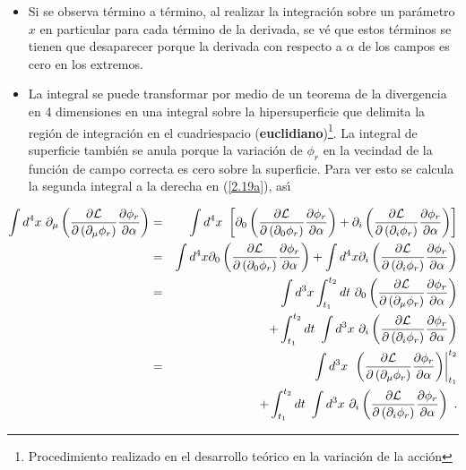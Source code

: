 \begin{itemize}
\item Si se observa t\'{e}rmino a t\'{e}rmino, al realizar la integraci\'{o}n sobre un parámetro $x$ en particular para cada t\'{e}rmino de la derivada, se v\'{e} que estos t\'{e}rminos se tienen que desaparecer porque la derivada con respecto a $\alpha $ de los campos es cero en los extremos.\\


\item La integral se puede transformar por medio de un teorema de la
divergencia en 4 dimensiones en una integral sobre la hipersuperficie que
delimita la regi\'{o}n de integraci\'{o}n en el cuadriespacio (\textbf{euclidiano})\footnote{Procedimiento realizado en el desarrollo teórico en la variación de la acción}. La integral de superficie tambi\'{e}n se anula porque la variaci\'{o}n de $\phi_{r}$ en la vecindad de la funci\'{o}n de campo correcta es cero sobre la superficie. Para ver esto se calcula la segunda integral a la derecha en (\ref{2.19a}), as\'{\i}
\end{itemize}

\begin{eqnarray}
\int d^{4}x~\partial _{\mu }\left( \frac{\partial \mathcal{L}}{\partial
\left( \partial _{\mu }\phi _{r}\right) }\frac{\partial \phi _{r}}{\partial
\alpha }\right)  &=&\int d^{4}x~\left[ \partial _{0}\left( \frac{\partial 
\mathcal{L}}{\partial \left( \partial _{0}\phi _{r}\right) }\frac{\partial
\phi _{r}}{\partial \alpha }\right) +\partial _{i}\left( \frac{\partial 
\mathcal{L}}{\partial \left( \partial _{i}\phi _{r}\right) }\frac{\partial
\phi _{r}}{\partial \alpha }\right) \right]   \notag \\
&=&\int d^{4}x\partial _{0}\left( \frac{\partial \mathcal{L}}{\partial
\left( \partial _{0}\phi _{r}\right) }\frac{\partial \phi _{r}}{\partial
\alpha }\right) +\int d^{4}x\partial _{i}\left( \frac{\partial \mathcal{L}}{%
\partial \left( \partial _{i}\phi _{r}\right) }\frac{\partial \phi _{r}}{%
\partial \alpha }\right)   \notag \\
&=&\int d^{3}x\int_{t_{1}}^{t_{2}}dt~\partial _{0}\left( \frac{\partial 
\mathcal{L}}{\partial \left( \partial _{\mu }\phi _{r}\right) }\frac{%
\partial \phi _{r}}{\partial \alpha }\right)   \notag \\
&&+\int_{t_{1}}^{t_{2}}dt~\int d^{3}x~\partial _{i}\left( \frac{\partial 
\mathcal{L}}{\partial \left( \partial _{i}\phi _{r}\right) }\frac{\partial
\phi _{r}}{\partial \alpha }\right)   \notag \\
&=&\int d^{3}x~\left. \left( \frac{\partial \mathcal{L}}{\partial \left(
\partial _{\mu }\phi _{r}\right) }\frac{\partial \phi _{r}}{\partial \alpha }%
\right) \right\vert _{t_{1}}^{t_{2}}  \notag \\
&&+\int_{t_{1}}^{t_{2}}dt~\int d^{3}x~\partial _{i}\left( \frac{\partial 
\mathcal{L}}{\partial \left( \partial _{i}\phi _{r}\right) }\frac{\partial
\phi _{r}}{\partial \alpha }\right) ~.
\end{eqnarray}

